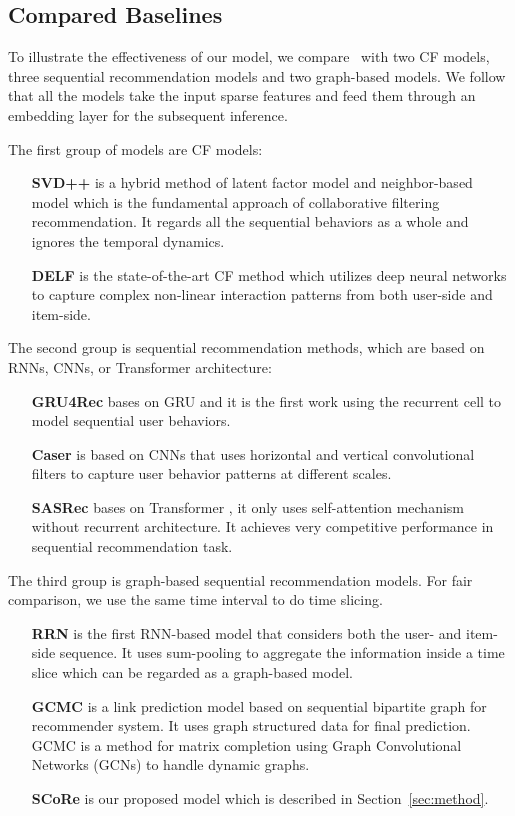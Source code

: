  
\subsection{Compared Baselines}\label{sec:comp-models}
To illustrate the effectiveness of our model, we compare \score ~with two CF models, three sequential recommendation models and two graph-based models.
We follow \cite{zhou2018deepb} that all the models take the input sparse features and feed them through an embedding layer for the subsequent inference.

The first group of models are CF models:
\begin{itemize}[leftmargin=40pt]
	\item [\textbf{SVD++}] \cite{koren2008factorization} is a hybrid method of latent factor model and neighbor-based model which is the fundamental approach of collaborative filtering recommendation. It regards all the sequential behaviors as a whole and ignores the temporal dynamics.
	\item [\textbf{DELF}] \cite{cheng2018delf} is the state-of-the-art CF method which utilizes deep neural networks to capture complex non-linear interaction patterns from both user-side and item-side.
\end{itemize}

The second group is sequential recommendation methods, which are based on RNNs, CNNs, or Transformer architecture:
\begin{itemize}[leftmargin=40pt]
	\item [\textbf{GRU4Rec}] \cite{hidasi2015session} bases on GRU and it is the first work using the recurrent cell to model sequential user behaviors.
	\item [\textbf{Caser}] \cite{tang2018personalized} is based on CNNs that uses horizontal and vertical convolutional filters to capture user behavior patterns at different scales.
	\item [\textbf{SASRec}] \cite{kang2018self} bases on Transformer \cite{vaswani2017attention}, it only uses self-attention mechanism without recurrent architecture. It achieves very competitive performance in sequential recommendation task.
\end{itemize}

The third group is graph-based sequential recommendation models. For fair comparison, we use the same time interval to do time slicing.
\begin{itemize}[leftmargin=40pt]
	\item [\textbf{RRN}] \cite{wu2017recurrent} is the first RNN-based model that considers both the user- and item-side sequence. It uses sum-pooling to aggregate the information inside a time slice which can be regarded as a graph-based model.
	\item [\textbf{GCMC}] \cite{fadel2018link} is a link prediction model based on sequential bipartite graph for recommender system. It uses graph structured data for final prediction. GCMC is a method for matrix completion using Graph Convolutional Networks (GCNs) to handle dynamic graphs. 
	\item [\textbf{SCoRe}] is our proposed model which is described in Section~\ref{sec:method}.
\end{itemize}

